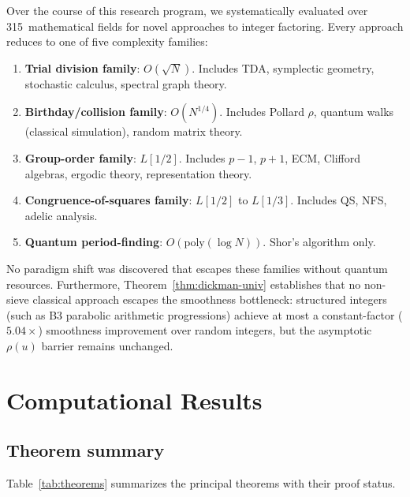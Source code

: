 \documentclass[12pt]{amsart}
\theoremstyle{definition}
\theoremstyle{remark}
\begin{document}
Over the course of this research program, we systematically evaluated over
315~mathematical fields for novel approaches to integer factoring.  Every
approach reduces to one of five complexity families:
\begin{enumerate}
  \item \textbf{Trial division family}: $O(\sqrt{N})$.  Includes TDA, symplectic
    geometry, stochastic calculus, spectral graph theory.
  \item \textbf{Birthday/collision family}: $O(N^{1/4})$.  Includes Pollard
    $\rho$, quantum walks (classical simulation), random matrix theory.
  \item \textbf{Group-order family}: $L[1/2]$.  Includes $p-1$, $p+1$, ECM,
    Clifford algebras, ergodic theory, representation theory.
  \item \textbf{Congruence-of-squares family}: $L[1/2]$ to $L[1/3]$.  Includes
    QS, NFS, adelic analysis.
  \item \textbf{Quantum period-finding}: $O(\mathrm{poly}(\log N))$.  Shor's
    algorithm only.
\end{enumerate}

\noindent
No paradigm shift was discovered that escapes these families without quantum
resources.  Furthermore, Theorem~\ref{thm:dickman-univ} establishes that no
non-sieve classical approach escapes the smoothness bottleneck: structured
integers (such as B3 parabolic arithmetic progressions) achieve at most a
constant-factor ($5.04\times$) smoothness improvement over random integers, but
the asymptotic $\rho(u)$ barrier remains unchanged.


\section{Computational Results}\label{sec:computational}

\subsection{Theorem summary}

Table~\ref{tab:theorems} summarizes the principal theorems with their proof
status.
\end{document}
